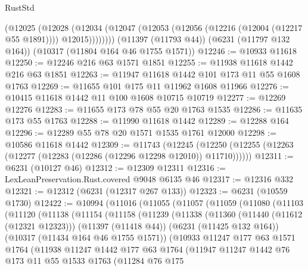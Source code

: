 \begin{lexlean}{RustStd}
\begin{coremodule}
{{          (@12025
            (@12028
              (@12034 (@12047 (@12053 (@12056 (@12216 (@12004 (@12217 @55 @1891)))) @12015))))))))
    (@11397 (@11793 @44))
    (@6231 (@11797 @132 @164))
    (@10317 (@11804 @164 @46 @1755 @1571))
@12246 := @10933 @11618
@12250 := @12246 @216 @63 @1571 @1851
@12255 := @11938 @11618 @1442 @216 @63 @1851
@12263 := @11947 @11618 @1442 @101 @173 @11 @55 @1608 @1763
@12269 := @11655 @101 @175 @11 @11962 @1608 @11966
@12276 := @10415 @11618 @1442 @11 @100 @1608 @10715 @10719
@12277 := @12269 @12276
@12283 := @11655 @173 @78 @55 @20 @1763 @1535
@12286 := @11635 @173 @55 @1763
@12288 := @11990 @11618 @1442
@12289 := @12288 @164
@12296 := @12289 @55 @78 @20 @1571 @1535 @1761 @12000
@12298 := @10586 @11618 @1442
@12309 := @11743
    (@12245 (@12250 (@12255 (@12263 (@12277 (@12283 (@12286 (@12296 @12298 @12010)) @11710))))))
@12311 := @6231 (@10127 @46)
@12312 := @12309 @12311
@12316 := LexLeanPreservation.Rust.covered @9048 @6135 @46
@12317 := @12316 @332
@12321 := @12312 (@6231 (@12317 @267 @133))
@12323 := @6231 (@10559 @1730)
@12422 := @10994
    (@11016
      (@11055
        (@11057
          (@11059
            (@11080
              (@11103
                (@11120
                  (@11138
                    (@11154
                      (@11158
                        (@11239
                          (@11338
                            (@11360
                              (@11440 (@11612 (@12321 @12323)))
                              (@11397 (@11418 @44))
                              (@6231 (@11425 @132 @164))
                              (@10317 (@11434 @164 @46 @1755 @1571))
                              (@10933
                                @11247
                                @177
                                @63
                                @1571
                                @1764
                                (@11938
                                  @11247
                                  @1442
                                  @177
                                  @63
                                  @1764
                                  (@11947
                                    @11247
                                    @1442
                                    @76
                                    @173
                                    @11
                                    @55
                                    @1533
                                    @1763
                                    (@11284
                                      @76
                                      @175
}}
\end{coremodule}
\end{lexlean}
